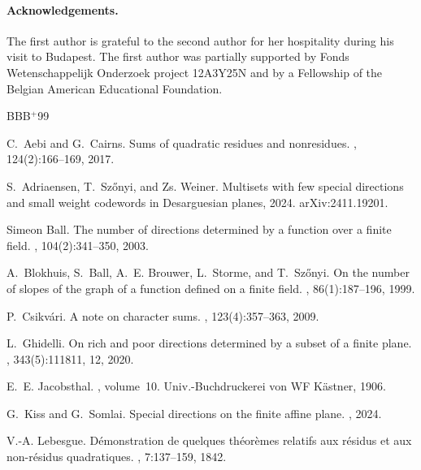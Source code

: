 \documentclass[a4paper, 12pt]{article}
\theoremstyle{definition}
\begin{document}
\paragraph{Acknowledgements.} The first author is grateful to the second author for her hospitality during his visit to Budapest.
The first author was partially supported by Fonds Wetenschappelijk Onderzoek project 12A3Y25N and by a Fellowship of the Belgian American Educational Foundation.



\newcommand{\etalchar}[1]{$^{#1}$}
\begin{thebibliography}{BBB{\etalchar{+}}99}

C.~Aebi and G.~Cairns.
\newblock Sums of quadratic residues and nonresidues.
, 124(2):166--169, 2017.

S.~Adriaensen, T.~Sz{\H o}nyi, and Zs. Weiner.
\newblock Multisets with few special directions and small weight codewords in {D}esarguesian planes, 2024.
\newblock arXiv:2411.19201.

Simeon Ball.
\newblock The number of directions determined by a function over a finite field.
, 104(2):341--350, 2003.

\bibitem[BBB{\etalchar{+}}99]{BBBSS:99}
A.~Blokhuis, S.~Ball, A.~E. Brouwer, L.~Storme, and T.~Sz\H{o}nyi.
\newblock On the number of slopes of the graph of a function defined on a finite field.
, 86(1):187--196, 1999.

P.~Csikv\'{a}ri.
\newblock A note on character sums.
, 123(4):357--363, 2009.

L.~Ghidelli.
\newblock On rich and poor directions determined by a subset of a finite plane.
, 343(5):111811, 12, 2020.

E.~E. Jacobsthal.
, volume~10.
\newblock Univ.-Buchdruckerei von WF K{\"a}stner, 1906.

G.~Kiss and G.~Somlai.
\newblock Special directions on the finite affine plane.
, 2024.

V.-A. Lebesgue.
\newblock D{\'e}monstration de quelques th{\'e}or{\`e}mes relatifs aux r{\'e}sidus et aux non-r{\'e}sidus quadratiques.
, 7:137--159, 1842.


\end{thebibliography}
\end{document}
